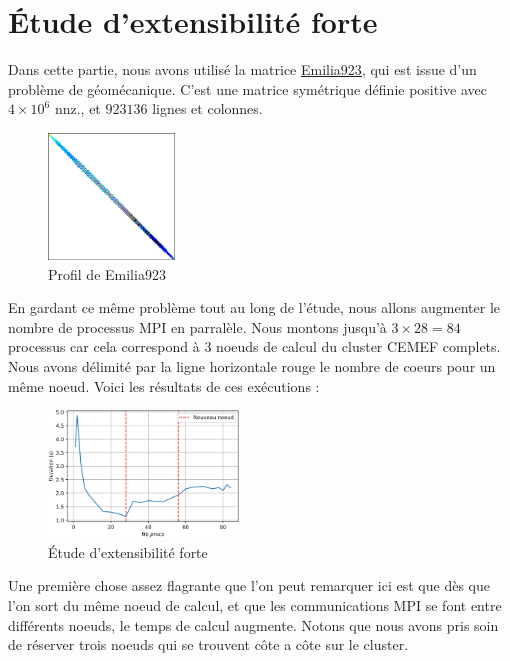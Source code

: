 \documentclass[10pt,twocolumn,letterpaper]{article}
\begin{document}
\section{Étude d'extensibilité forte}

Dans cette partie, nous avons utilisé la matrice
\href{https://sparse.tamu.edu/Janna/Emilia_923}{Emilia923}, qui est issue d'un
problème de géomécanique. C'est une matrice symétrique définie positive avec 
$4\times 10^6$ nnz., et $923136$ lignes et colonnes.

\begin{figure}[H]
  \centering
  \caption{Profil de Emilia923}
  \includegraphics[width=0.3\textwidth]{fig/Emilia923.png}
\end{figure}

En gardant ce même problème tout au long de l'étude, nous allons augmenter 
le nombre de processus MPI en parralèle. Nous montons jusqu'à $3 \times 28 = 84$
processus car cela correspond à $3$ noeuds de calcul du cluster CEMEF complets.
Nous avons délimité par la ligne horizontale rouge le nombre de coeurs pour un
même noeud.
Voici les résultats de ces exécutions :

\begin{figure}[H]
    \centering
    \caption{Étude d'extensibilité forte}
    \includegraphics[width=0.45\textwidth]{fig/strong_scalab.png}
  \end{figure}

Une première chose assez flagrante que l'on peut remarquer ici est que dès que
l'on sort du même noeud de calcul, et que les communications MPI se font entre 
différents noeuds, le temps de calcul augmente.
Notons que nous avons pris soin de
réserver trois noeuds qui se trouvent côte a côte sur le cluster.
\end{document}
